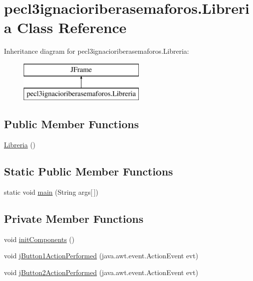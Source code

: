 \hypertarget{classpecl3ignacioriberasemaforos_1_1_libreria}{}\section{pecl3ignacioriberasemaforos.\+Libreria Class Reference}
\label{classpecl3ignacioriberasemaforos_1_1_libreria}
Inheritance diagram for pecl3ignacioriberasemaforos.\+Libreria\+:\begin{figure}[H]
\begin{center}
\leavevmode
\includegraphics[height=2.000000cm]{classpecl3ignacioriberasemaforos_1_1_libreria}
\end{center}
\end{figure}
\subsection*{Public Member Functions}
\begin{DoxyCompactItemize}
\item 
\mbox{\hyperlink{classpecl3ignacioriberasemaforos_1_1_libreria_ae14b9cc89b983b16f50e1b9cb1d08949}{Libreria}} ()
\end{DoxyCompactItemize}
\subsection*{Static Public Member Functions}
\begin{DoxyCompactItemize}
\item 
static void \mbox{\hyperlink{classpecl3ignacioriberasemaforos_1_1_libreria_a2f047a64f694b1b2b7591f85df9f10c2}{main}} (String args\mbox{[}$\,$\mbox{]})
\end{DoxyCompactItemize}
\subsection*{Private Member Functions}
\begin{DoxyCompactItemize}
\item 
void \mbox{\hyperlink{classpecl3ignacioriberasemaforos_1_1_libreria_a5cb6c2cf0af1403f0a1e7468af2cf35d}{init\+Components}} ()
\item 
void \mbox{\hyperlink{classpecl3ignacioriberasemaforos_1_1_libreria_a8a4a4d88e57496a963d12a4b9bccff9b}{j\+Button1\+Action\+Performed}} (java.\+awt.\+event.\+Action\+Event evt)
\item 
void \mbox{\hyperlink{classpecl3ignacioriberasemaforos_1_1_libreria_a1e264ca2fc8e02695c41a3adac3db644}{j\+Button2\+Action\+Performed}} (java.\+awt.\+event.\+Action\+Event evt)
\end{DoxyCompactItemize}
